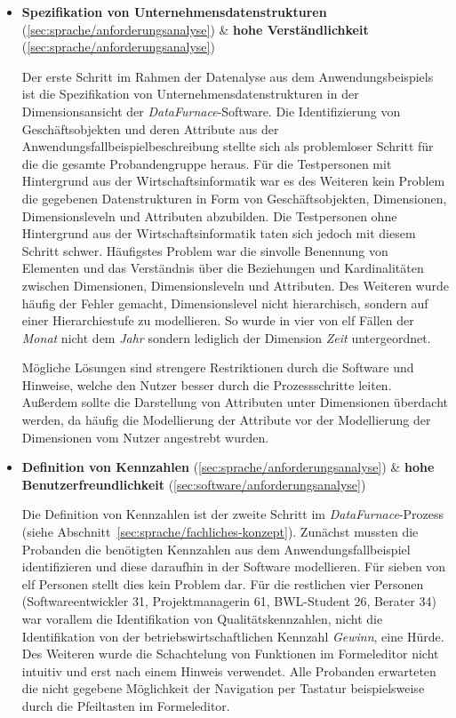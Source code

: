 \documentclass[
  language=german, %
  type=bachelor,%
  ngerman
]{isthesis}
\begin{document}
\begin{content}
\begin{itemize}
  \item \textbf{Spezifikation von Unternehmensdatenstrukturen} (\ref{sec:sprache/anforderungsanalyse}) \& \textbf{hohe Verständlichkeit} (\ref{sec:sprache/anforderungsanalyse})

    Der erste Schritt im Rahmen der Datenalyse aus dem Anwendungsbeispiels ist
    die Spezifikation von Unternehmensdatenstrukturen in der Dimensionsansicht
    der \textit{DataFurnace}-Software. Die Identifizierung von
    Geschäftsobjekten und deren Attribute aus der
    Anwendungsfallbeispielbeschreibung stellte sich als problemloser Schritt
    für die die gesamte Probandengruppe heraus. Für die Testpersonen mit
    Hintergrund aus der Wirtschaftsinformatik war es des Weiteren kein Problem
    die gegebenen Datenstrukturen in Form von Geschäftsobjekten, Dimensionen,
    Dimensionsleveln und Attributen abzubilden. Die Testpersonen ohne
    Hintergrund aus der Wirtschaftsinformatik taten sich jedoch mit diesem
    Schritt schwer. Häufigstes Problem war die sinvolle Benennung von Elementen
    und das Verständnis über die Beziehungen und Kardinalitäten zwischen
    Dimensionen, Dimensionsleveln und Attributen. Des Weiteren wurde häufig der
    Fehler gemacht, Dimensionslevel nicht hierarchisch, sondern auf einer
    Hierarchiestufe zu modellieren. So wurde in vier von elf Fällen
    der \textit{Monat} nicht dem \textit{Jahr} sondern lediglich der Dimension
    \textit{Zeit} untergeordnet. 
    
    Mögliche Lösungen sind strengere Restriktionen durch die
    Software und Hinweise, welche den Nutzer besser durch die Prozessschritte
    leiten. Außerdem sollte die Darstellung von Attributen unter Dimensionen
    überdacht werden, da häufig die Modellierung der Attribute vor der
    Modellierung der Dimensionen vom Nutzer angestrebt wurden.

  \item \textbf{Definition von Kennzahlen} (\ref{sec:sprache/anforderungsanalyse}) \& \textbf{hohe Benutzerfreundlichkeit} (\ref{sec:software/anforderungsanalyse})

    Die Definition von Kennzahlen ist der zweite Schritt im
    \textit{DataFurnace}-Prozess (siehe
    Abschnitt~\ref{sec:sprache/fachliches-konzept}). Zunächst mussten die
    Probanden die benötigten Kennzahlen aus dem Anwendungsfallbeispiel
    identifizieren und diese daraufhin in der Software modellieren. Für sieben
    von elf Personen stellt dies kein Problem dar.  Für die restlichen vier
    Personen (Softwareentwickler 31, Projektmanagerin 61, BWL-Student 26,
    Berater 34) war vorallem die Identifikation von Qualitätskennzahlen, nicht
    die Identifikation von der betriebswirtschaftlichen Kennzahl
    \textit{Gewinn}, eine Hürde. Des Weiteren wurde die Schachtelung von
    Funktionen im Formeleditor nicht intuitiv und erst nach einem Hinweis
    verwendet. Alle Probanden erwarteten die nicht gegebene Möglichkeit der
    Navigation per Tastatur beispielsweise durch die Pfeiltasten im
    Formeleditor.


\end{itemize}
\end{content}
\end{document}
